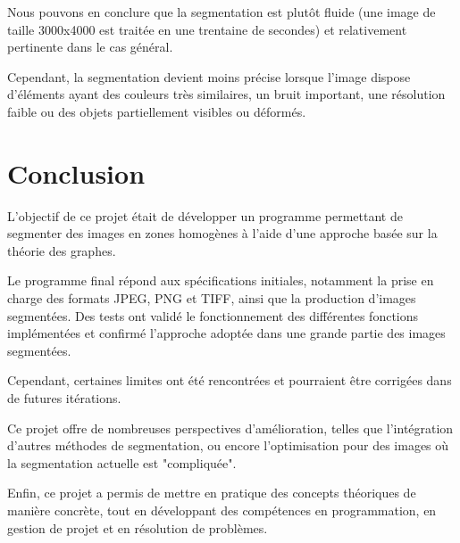 \documentclass[a4paper,12pt]{report}
\begin{document}
Nous pouvons en conclure que la segmentation est plutôt fluide (une image de taille 3000x4000 est traitée en une trentaine de secondes) et relativement pertinente dans le cas général.

Cependant, la segmentation devient moins précise lorsque l'image dispose d'éléments ayant des couleurs très similaires, un bruit important, une résolution faible ou des objets partiellement visibles ou déformés.


\chapter{Conclusion}

L’objectif de ce projet était de développer un programme permettant de segmenter des images en zones homogènes à l’aide d’une approche basée sur la théorie des graphes.

Le programme final répond aux spécifications initiales, notamment la prise en charge des formats JPEG, PNG et TIFF, ainsi que la production d’images segmentées. Des tests ont validé le fonctionnement des différentes fonctions implémentées et confirmé l'approche adoptée dans une grande partie des images segmentées.

Cependant, certaines limites ont été rencontrées et pourraient être corrigées dans de futures itérations.

Ce projet offre de nombreuses perspectives d’amélioration, telles que l’intégration d’autres méthodes de segmentation, ou encore l’optimisation pour des images où la segmentation actuelle est "compliquée". 

Enfin, ce projet a permis de mettre en pratique des concepts théoriques de manière concrète, tout en développant des compétences en programmation, en gestion de projet et en résolution de problèmes.

\nocite{*}



\end{document}
